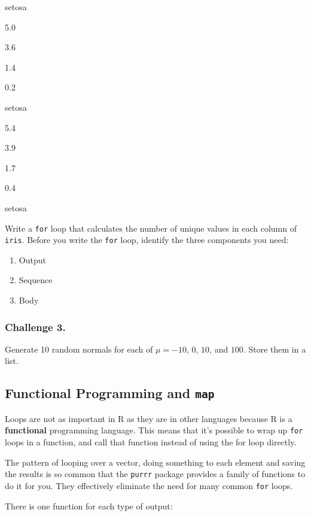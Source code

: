 \documentclass[]{book}
\providecommand{\tightlist}{%
  \setlength{\itemsep}{0pt}\setlength{\parskip}{0pt}}
\begin{document}
setosa

5.0

3.6

1.4

0.2

setosa

5.4

3.9

1.7

0.4

setosa

Write a \texttt{for} loop that calculates the number of unique values in each column of \texttt{iris}. Before you write the \texttt{for} loop, identify the three components you need:

\begin{enumerate}
\def\labelenumi{\arabic{enumi}.}
\tightlist
\item
  Output
\item
  Sequence
\item
  Body
\end{enumerate}

\hypertarget{challenge-3.-8}{%
\subsubsection*{Challenge 3.}\label{challenge-3.-8}}

Generate 10 random normals for each of \(\mu = -10\), \(0\), \(10\), and \(100\). Store them in a list.

\hypertarget{functional-programming-and-map}{%
\subsection{\texorpdfstring{Functional Programming and \texttt{map}}{Functional Programming and map}}\label{functional-programming-and-map}}

Loops are not as important in R as they are in other languages because R is a \textbf{functional} programming language. This means that it's possible to wrap up \texttt{for} loops in a function, and call that function instead of using the for loop directly.

The pattern of looping over a vector, doing something to each element and saving the results is so common that the \texttt{purrr} package provides a family of functions to do it for you. They effectively eliminate the need for many common \texttt{for} loops.

There is one function for each type of output:
\end{document}
